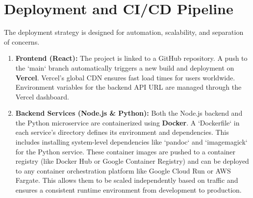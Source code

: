 \FloatBarrier

\section{Deployment and CI/CD Pipeline}
\label{sec:impl-deployment}
The deployment strategy is designed for automation, scalability, and separation of concerns.
\begin{enumerate}
    \item \textbf{Frontend (React):} The project is linked to a GitHub repository. A push to the `main` branch automatically triggers a new build and deployment on \textbf{Vercel}. Vercel's global CDN ensures fast load times for users worldwide. Environment variables for the backend API URL are managed through the Vercel dashboard.
    
    \item \textbf{Backend Services (Node.js \& Python):} Both the Node.js backend and the Python microservice are containerized using \textbf{Docker}. A `Dockerfile` in each service's directory defines its environment and dependencies. This includes installing system-level dependencies like `pandoc` and `imagemagick` for the Python service. These container images are pushed to a container registry (like Docker Hub or Google Container Registry) and can be deployed to any container orchestration platform like Google Cloud Run or AWS Fargate. This allows them to be scaled independently based on traffic and ensures a consistent runtime environment from development to production.
\end{enumerate}